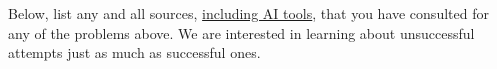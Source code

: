 \documentclass[addpoints]{exam}
\begin{document}
\begin{questions}
  \begin{solution}
  \end{solution}

  \question Below, list any and all sources, \href{https://hulms.instructure.com/courses/2616/discussion_topics/29240}{including AI tools}, that you have consulted for any of the problems above. We are interested in learning about unsuccessful attempts just as much as successful ones.

  \begin{solution}
  \end{solution}
  
\end{questions}
\end{document}
